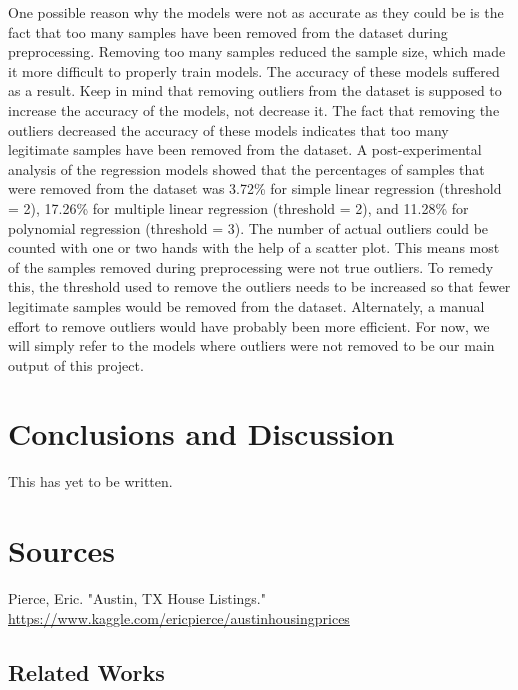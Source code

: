 \documentclass[12pt]{article}
\begin{document}
	One possible reason why the models were not as accurate as they could be is the fact that too many samples have been removed from the dataset during preprocessing. Removing too many samples reduced the sample size, which made it more difficult to properly train models. The accuracy of these models suffered as a result. Keep in mind that removing outliers from the dataset is supposed to increase the accuracy of the models, not decrease it. The fact that removing the outliers decreased the accuracy of these models indicates that too many legitimate samples have been removed from the dataset. A post-experimental analysis of the regression models showed that the percentages of samples that were removed from the dataset was 3.72\% for simple linear regression (threshold = 2), 17.26\% for multiple linear regression (threshold = 2), and 11.28\% for polynomial regression (threshold = 3). The number of actual outliers could be counted with one or two hands with the help of a scatter plot. This means most of the samples removed during preprocessing were not true outliers. To remedy this, the threshold used to remove the outliers needs to be increased so that fewer legitimate samples would be removed from the dataset. Alternately, a manual effort to remove outliers would have probably been more efficient. For now, we will simply refer to the models where outliers were not removed to be our main output of this project. 
	
	\section{Conclusions and Discussion}
	
	This has yet to be written.
	
	\section{Sources}
	
	Pierce, Eric. "Austin, TX House Listings." \url{https://www.kaggle.com/ericpierce/austinhousingprices}
	
	\subsection{Related Works}
	
\end{document}
